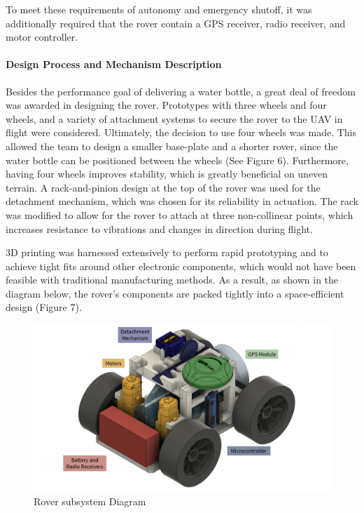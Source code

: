 To meet these requirements of autonomy and emergency shutoff, it was additionally required that the rover contain a GPS receiver, radio receiver, and motor controller. 

\paragraph{Design Process and Mechanism Description} 
Besides the performance goal of delivering a water bottle, a great deal of freedom was awarded in designing the rover. Prototypes with three wheels and four wheels, and a variety of attachment systems to secure the rover to the UAV in flight were considered. Ultimately, the decision to use four wheels was made. This allowed the team to design a smaller base-plate and a shorter rover, since the water bottle can be positioned between the wheels (See Figure 6). Furthermore, having four wheels improves stability, which is greatly beneficial on uneven terrain. A rack-and-pinion design at the top of the rover was used for the detachment mechanism, which was chosen for its reliability in actuation. The rack was modified to allow for the rover to attach at three non-collinear points, which increases resistance to vibrations and changes in direction during flight. 

3D printing was harnessed extensively to perform rapid prototyping and to achieve tight fits around other electronic components, which would not have been feasible with traditional manufacturing methods. As a result, as shown in the diagram below, the rover’s components are packed tightly into a space-efficient design (Figure 7).

\begin{figure}[H]\centering
\includegraphics[width=\linewidth]{figures/Rover_Diagram.png}
\caption{Rover subsystem Diagram}
\label{fig:systems_link_diagram}
\end{figure}

